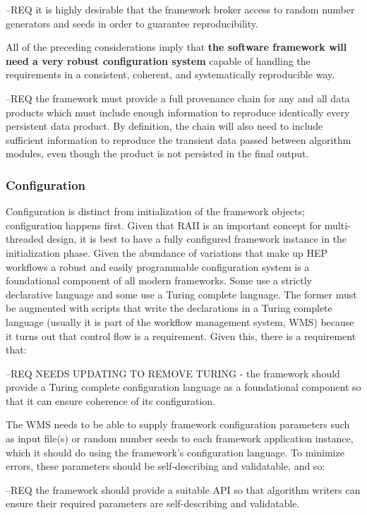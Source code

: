 \documentclass[../main-v1.tex]{subfiles}
\begin{document}
--REQ it is highly desirable that the framework broker access to random number generators and seeds in order to guarantee reproducibility.  

All of the preceding considerations imply that {\bf the software framework will need a very robust configuration system} capable of handling the requirements in a consistent, coherent, and systematically reproducible way.

--REQ the framework must provide a full provenance chain for any and all data products which must include enough information to reproduce identically every persistent data product.  By definition, the chain will also need to include sufficient information to reproduce the transient data passed between algorithm modules, even though the product is not persisted in the final output.  

\subsubsection{Configuration}

Configuration is distinct from initialization of the framework objects; configuration happens first.  Given that RAII is an important concept for multi-threaded design, it is best to have a fully configured framework instance in the initialization phase.  Given the abundance of variations that make up HEP workflows a robust and easily programmable configuration system is a foundational component of all modern frameworks.  Some use a strictly declarative language and some use a Turing complete language.  The former must be augmented with scripts that write the declarations in a Turing complete language (usually it is part of the workflow management system, WMS) because it turns out that control flow is a requirement.  Given this, there is a requirement that:

--REQ NEEDS UPDATING TO REMOVE TURING - the framework should provide a Turing complete configuration language as a foundational component so that it can ensure coherence of its configuration.

The WMS needs to be able to supply framework configuration parameters such as input file(s) or random number seeds to each framework application instance, which it should do using the framework’s configuration language.  To minimize errors, these parameters should be self-describing and validatable, and so:

--REQ the framework should provide a suitable API so that algorithm writers can ensure their required parameters are self-describing and validatable.
\end{document}
